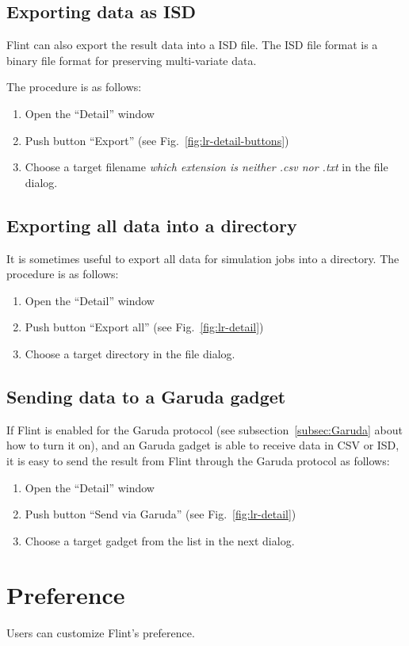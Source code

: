 \documentclass[a4paper,10pt]{report}
\begin{document}
\subsection{Exporting data as ISD}
Flint can also export the result data into a ISD file.
The ISD file format is a binary file format for preserving multi-variate data.

The procedure is as follows:
\begin{enumerate}
\item Open the ``Detail'' window
\item Push button ``Export'' (see Fig.~\ref{fig:lr-detail-buttons})
\item Choose a target filename \emph{which extension is neither .csv nor .txt}
  in the file dialog.
\end{enumerate}

\subsection{Exporting all data into a directory}
It is sometimes useful to export all data for simulation jobs into a directory.
The procedure is as follows:
\begin{enumerate}
\item Open the ``Detail'' window
\item Push button ``Export all'' (see Fig.~\ref{fig:lr-detail})
\item Choose a target directory in the file dialog.
\end{enumerate}

\subsection{Sending data to a Garuda gadget}
If Flint is enabled for the Garuda protocol (see subsection~\ref{subsec:Garuda}
about how to turn it on), and an Garuda gadget is able to receive data in CSV or
ISD, it is easy to send the result from Flint through the Garuda protocol as
follows:
\begin{enumerate}
\item Open the ``Detail'' window
\item Push button ``Send via Garuda'' (see Fig.~\ref{fig:lr-detail})
\item Choose a target gadget from the list in the next dialog.
\end{enumerate}

\section{Preference}
\label{sec:preference}
Users can customize Flint's preference.
\end{document}
